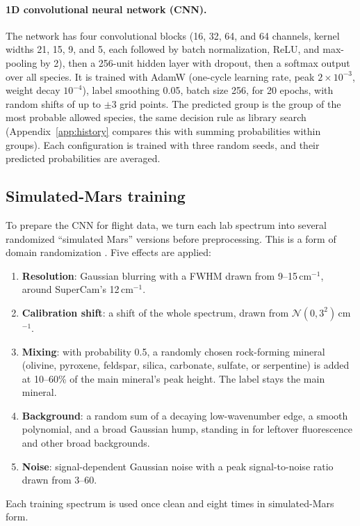 \paragraph{1D convolutional neural network (CNN).} The network has four convolutional blocks (16, 32, 64, and 64 channels, kernel widths 21, 15, 9, and 5, each followed by batch normalization, ReLU, and max-pooling by 2), then a 256-unit hidden layer with dropout, then a softmax output over all \nSpecies{} species. It is trained with AdamW (one-cycle learning rate, peak $2\times10^{-3}$, weight decay $10^{-4}$), label smoothing 0.05, batch size 256, for 20 epochs, with random shifts of up to $\pm 3$ grid points. The predicted group is the group of the most probable allowed species, the same decision rule as library search (Appendix~\ref{app:history} compares this with summing probabilities within groups). Each configuration is trained with three random seeds, and their predicted probabilities are averaged.

\subsection{Simulated-Mars training}
\label{sec:marsify}
To prepare the CNN for flight data, we turn each lab spectrum into several randomized ``simulated Mars'' versions before preprocessing. This is a form of domain randomization \citep{tobin2017domain}. Five effects are applied:
\begin{enumerate}
\item \textbf{Resolution}: Gaussian blurring with a FWHM drawn from 9--15\,cm$^{-1}$, around SuperCam's 12\,cm$^{-1}$.
\item \textbf{Calibration shift}: a shift of the whole spectrum, drawn from $\mathcal{N}(0, 3^2)$\,cm$^{-1}$.
\item \textbf{Mixing}: with probability 0.5, a randomly chosen rock-forming mineral (olivine, pyroxene, feldspar, silica, carbonate, sulfate, or serpentine) is added at 10--60\% of the main mineral's peak height. The label stays the main mineral.
\item \textbf{Background}: a random sum of a decaying low-wavenumber edge, a smooth polynomial, and a broad Gaussian hump, standing in for leftover fluorescence and other broad backgrounds.
\item \textbf{Noise}: signal-dependent Gaussian noise with a peak signal-to-noise ratio drawn from 3--60.
\end{enumerate}
Each training spectrum is used once clean and eight times in simulated-Mars form.

